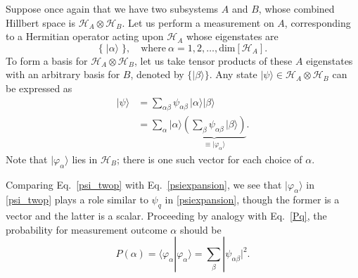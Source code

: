 \documentclass[prx,12pt]{revtex4-2}
\begin{document}
Suppose once again that we have two subsystems $A$ and $B$, whose
combined Hillbert space is $\mathscr{H}_A \otimes \mathscr{H}_B$.  Let
us perform a measurement on $A$, corresponding to a Hermitian operator
acting upon $\mathscr{H}_A$ whose eigenstates are
\begin{equation*}
  \big\{\;|\alpha\rangle\; \big\}, \quad
  \mathrm{where}~\alpha = 1, 2, \dots, \mathrm{dim}\left[\mathscr{H}_A\right].
\end{equation*}
To form a basis for $\mathscr{H}_A \otimes \mathscr{H}_B$, let us take
tensor products of these $A$ eigenstates with an arbitrary basis for
$B$, denoted by $\{|\beta\rangle\}$.  Any state $|\psi\rangle \in
\mathscr{H}_A \otimes \mathscr{H}_B$ can be expressed as
\begin{align}
  |\psi\rangle &= \sum_{\alpha\beta}
  \psi_{\alpha\beta}\, |\alpha\rangle |\beta\rangle \\
  &= \sum_\alpha |\alpha\rangle \underbrace{\left( \sum_\beta \psi_{\alpha\beta}\,|\beta\rangle\right)}_{\displaystyle \equiv |\varphi_\alpha\rangle}.
  \label{psi_twop}
\end{align}
Note that $|\varphi_\alpha\rangle$ lies in $\mathscr{H}_B$; there is
one such vector for each choice of $\alpha$.

Comparing Eq.~\eqref{psi_twop} with Eq.~\eqref{psiexpansion}, we see
that $|\varphi_\alpha\rangle$ in \eqref{psi_twop} plays a role similar
to $\psi_q$ in \eqref{psiexpansion}, though the former is a vector and
the latter is a scalar.  Proceeding by analogy with Eq.~\eqref{Pq},
the probability for measurement outcome $\alpha$ should be
\begin{equation}
  P(\alpha) = \langle\varphi_\alpha|\varphi_\alpha\rangle
  = \sum_\beta |\psi_{\alpha\beta}|^2.
  \label{Palpha0}
\end{equation}
\end{document}

